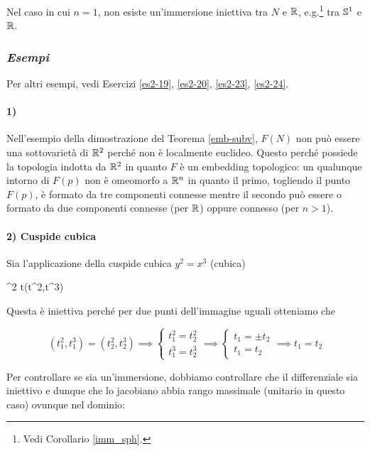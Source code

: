 Nel caso in cui $ n=1 $, non esiste un'immersione iniettiva tra $ N $ e $ \R $, e.g.\footnote{%
	Vedi Corollario \ref{imm_sph}.%
} tra $ \S^{1} $ e $ \R $.

\subsubsection{\textit{Esempi}}

Per altri esempi, vedi Esercizi \ref{es2-19}, \ref{es2-20}, \ref{es2-23}, \ref{es2-24}.

\paragraph{1)}

Nell'esempio della dimostrazione del Teorema \ref{emb-subv}, $ F(N) $ non può essere una sottovarietà di $ \R^{2} $ perché non è localmente euclideo. Questo perché possiede la topologia indotta da $ \R^{2} $ in quanto $ F $ è un embedding topologico: un qualunque intorno di $ F(p) $ non è omeomorfo a $ \R^{n} $ in quanto il primo, togliendo il punto $ F(p) $, è formato da tre componenti connesse mentre il secondo può essere o formato da due componenti connesse (per $ \R $) oppure connesso (per $ n > 1 $).

\paragraph{2) Cuspide cubica}

Sia l'applicazione della cuspide cubica $ y^{2} = x^{3} $ (cubica)

	{\R}{\R^{2}}
	{t}{(t^{2},t^{3})}

Questa è iniettiva perché per due punti dell'immagine uguali otteniamo che

\begin{equation}
	(t_{1}^{2},t_{1}^{3}) = (t_{2}^{2},t_{2}^{3}) %
	\implies %
	\begin{cases}
		t_{1}^{2} = t_{2}^{2} \\
		t_{1}^{3} = t_{2}^{3}
	\end{cases} %
	\implies %
	\begin{cases}
		t_{1} = \pm t_{2} \\
		t_{1} = t_{2}
	\end{cases} %
	\implies %
	t_{1} = t_{2}
\end{equation}

Per controllare se sia un'immersione, dobbiamo controllare che il differenziale sia iniettivo e dunque che lo jacobiano abbia rango massimale (unitario in questo caso) ovunque nel dominio:

